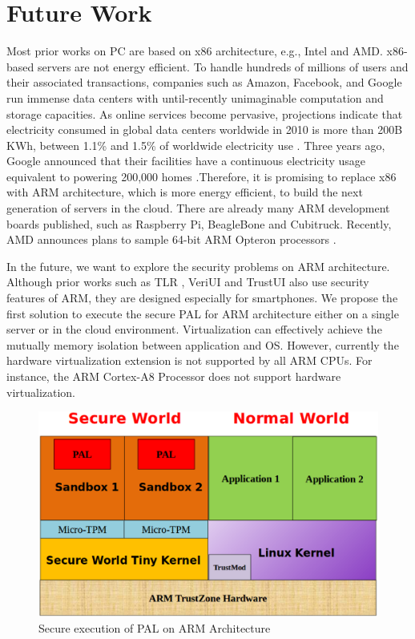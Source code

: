 \section{Future Work}
\label{sec:future}

Most prior works on PC are based on x86 architecture, e.g., Intel and AMD.
x86-based servers are not energy efficient. To handle hundreds of millions of
users and their associated transactions, companies such as Amazon, Facebook,
and Google run immense data centers with until-recently unimaginable
computation and storage capacities. As online services become pervasive,
projections indicate that electricity consumed in global data centers worldwide
in 2010 is more than 200B KWh, between 1.1\% and 1.5\% of worldwide electricity
use \cite{times}. Three years ago, Google announced that their facilities have
a continuous electricity usage equivalent to powering 200,000 homes
\cite{nytimes-google}.Therefore, it is promising to replace x86 with ARM
architecture, which is more energy efficient, to build the next generation of
servers in the cloud. There are already many ARM development boards published,
such as Raspberry Pi, BeagleBone and Cubitruck. Recently, AMD announces plans
to sample 64-bit ARM Opteron processors \cite{amdarm}. 

In the future, we want to explore the security problems on ARM architecture.
Although prior works such as TLR \cite{TLR}, VeriUI \cite{VeriUI} and TrustUI
\cite{TrustUI} also use security features of ARM, they are designed especially
for smartphones. We propose the first solution to execute the secure PAL for ARM
architecture either on a single server or in the cloud environment.
Virtualization can effectively achieve the mutually memory isolation between
application and OS. However, currently the hardware virtualization extension is
not supported by all ARM CPUs. For instance, the ARM Cortex-A8 Processor does
not support hardware virtualization.

\begin{figure}[htb]
\centering
\includegraphics[width=\columnwidth]{figures/future.eps}
\caption{Secure execution of PAL on ARM Architecture}
\label{fig:future}
\end{figure}

